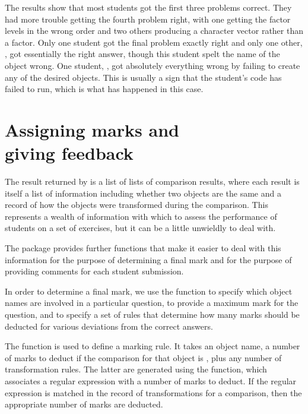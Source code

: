 The results show that most students got the first three problems 
correct.  They had more trouble getting the fourth problem right,
with one getting the factor levels in the wrong order and two others
producing a character vector rather than a factor.  Only one student
got the final problem exactly right and only one other, 
, got essentially
the right answer, though this student spelt the name of the object
wrong.  One student, , got absolutely everything
wrong by failing to create any of the desired objects.  This is 
usually a sign that the student's code has failed to run, which is
what has happened in this case.

\section*{Assigning marks and\\giving feedback}

The result returned by  is a list of lists of 
comparison results, where each result is itself a list of information
including whether two objects are the same and a record of 
how the objects were 
transformed during the comparison.  This represents a wealth 
of information with which to assess the performance of students
on a set of \R{} exercises, but it can be a little unwieldly to deal with.

The  package provides further functions that make it easier
to deal with this information for the purpose of determining a final mark
and for the purpose of providing comments
for each student submission.

In order to determine a final mark, we use the  function
to specify which object names are involved in a particular question,
to provide a maximum mark for the question, and to
specify a set of rules that determine how many marks should be deducted for
various deviations from the correct answers.
  
The  function is used
to define a marking rule.  It takes an object name, a number of marks
to deduct if the comparison for that object is , 
plus any number of 
transformation rules.  The latter are
 generated using the  function, which
associates a regular expression with a number of
marks to deduct.  If the regular expression is matched in the record of 
transformations for a comparison, 
then the appropriate number of marks are deducted.  

